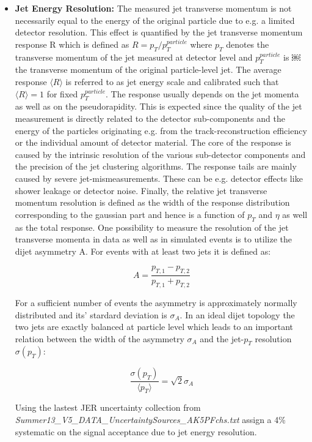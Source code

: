 \begin{itemize}
  \item \textbf{Jet Energy Resolution:}  The measured jet transverse momentum is not necessarily equal to the energy of the original particle due to e.g. a limited detector resolution. This effect is quantified by the jet transverse momentum response R which is defined as $R = p_{T} / p_{T}^{particle}$  where $p_{T}$ denotes the transverse momentum of the jet measured at detector level and $p_{T}^{particle}$ is ￼the transverse momentum of the original particle-level jet. The average response $\langle R \rangle$ is referred to as jet energy scale and calibrated such that $\langle R \rangle = 1$ for fixed $p_{T}^{particle}$. The response usually depends on the jet momenta as well as on the pseudorapidity. This is expected since the quality of the jet measurement is directly related to the detector sub-components and the energy of the particles originating e.g. from the track-reconstruction efficiency or the individual amount of detector material. The core of the response is caused by the intrinsic resolution of the various sub-detector components and the precision of the jet clustering algorithms. The response tails are mainly caused by severe jet-mismeasurements. These can be e.g. detector effects like shower leakage or detector noise. Finally, the relative jet transverse momentum resolution is defined as the width of the response distribution corresponding to the gaussian part and hence is a function of $p_{T}$ and $\eta$ as well as the total response. One possibility to measure the resolution of the jet transverse momenta in data as well as in simulated events is to utilize the dijet asymmetry A. For events with at least two jets it is defined as:
  
  \begin{equation}
  A = \frac{p_{T,1} - p_{T,2}}{p_{T,1} + p_{T,2}}
  \end{equation}
  
  For a sufficient number of events the asymmetry is approximately normally distributed and its' stardard deviation is $\sigma_{A}$. In an ideal dijet topology the two jets are exactly balanced at particle level which leads to an important relation between the width of the asymmetry $\sigma_{A}$ and the jet-$p_{T}$ resolution $\sigma(p_{T})$:
  
  \begin{equation}
  \frac{\sigma(p_{T})}{\langle p_{T} \rangle} = \sqrt{2} \sigma_{A}
  \end{equation}
  
  Using the lastest JER uncertainty collection from \textit{Summer13\_V5\_DATA\_Uncertainty\-Sources\_AK5PFchs.txt} assign a 4\% systematic on the signal acceptance due to jet energy resolution. 


\end{itemize}

